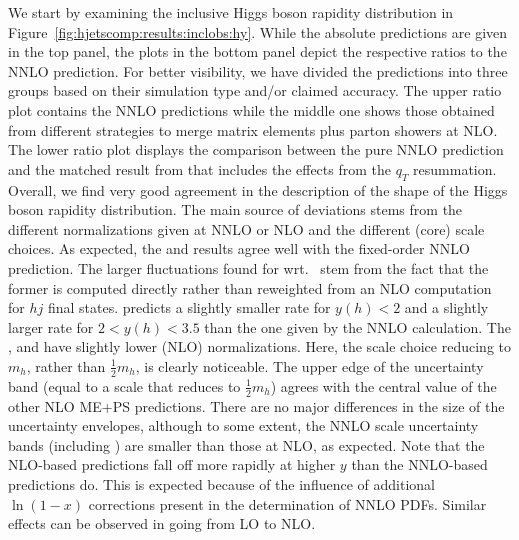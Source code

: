 We start by examining the inclusive Higgs boson rapidity distribution in
Figure~\ref{fig:hjetscomp:results:inclobs:hy}. While the absolute
predictions are given in the top panel, the plots in the bottom panel
depict the respective ratios to the NNLO prediction. For better
visibility, we have divided the predictions into three groups based on
their simulation type and/or claimed accuracy. The upper ratio plot
contains the NNLO predictions while the middle one shows those obtained
from different strategies to merge matrix elements plus parton showers
at NLO. The lower ratio plot displays the comparison between the pure
NNLO prediction and the matched result from \Resbos that includes the
effects from the $q_T$ resummation. Overall, we find very good
agreement in the description of the shape of the Higgs boson rapidity
distribution. The main source of deviations stems from the different
normalizations given at NNLO or NLO and the different (core) scale
choices. As expected, the \Sherpa \NNLOPS and
\Powheg \NNLOPS results agree well with the fixed-order NNLO prediction. 
The larger fluctuations found for \Sherpa \NNLOPS wrt.~\Powheg \NNLOPS
stem from the fact that the former is computed directly rather than
reweighted from an NLO computation for $hj$ final states.
\Resbos predicts a slightly smaller rate for $y(h)<2$ and a
slightly larger rate for $2<y(h)<3.5$ than the one given by the NNLO
calculation. The \MGaMC, \Sherpa \MEPSatNLO and \Herwig have slightly
lower (NLO) normalizations. Here, the \MGaMC scale choice reducing to
$m_h$, rather than $\tfrac{1}{2}m_h$, is clearly noticeable. The upper edge of
the \MGaMC uncertainty band (equal to a scale that reduces to $\tfrac{1}{2}m_h$)
agrees with the central value of the other NLO ME+PS
predictions. There are no major differences in the size of the
uncertainty envelopes, although to some extent, the NNLO scale
uncertainty bands (including \Resbos) are smaller than those at NLO,
as expected. Note
that the NLO-based predictions fall off more rapidly at higher $y$
than the NNLO-based predictions do. This is expected because of the
influence of additional $\ln(1-x)$ corrections present in the
determination of NNLO PDFs. Similar effects can be observed in going
from LO to NLO.

